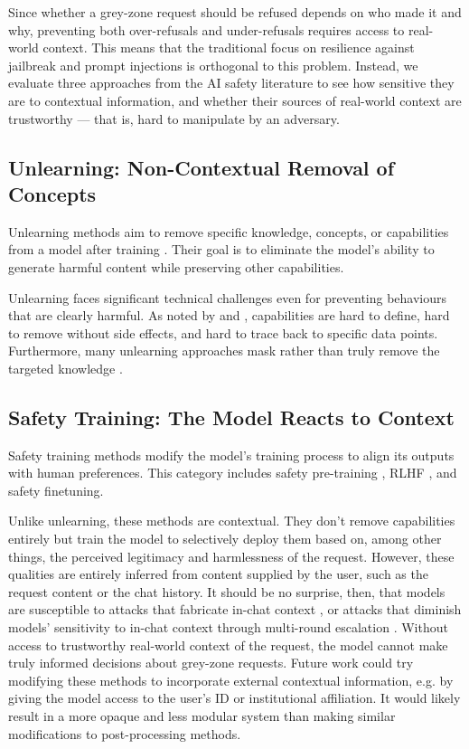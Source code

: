 \documentclass{article}
\theoremstyle{plain}
\theoremstyle{definition}
\theoremstyle{remark}
\begin{document}
Since whether a grey-zone request should be refused depends on who made it and why, preventing both over-refusals and under-refusals requires access to real-world context.
This means that the traditional focus on resilience against jailbreak and prompt injections is orthogonal to this problem.
Instead, we evaluate three approaches from the AI safety literature to see how sensitive they are to contextual information, and whether their sources of real-world context are trustworthy --- that is, hard to manipulate by an adversary.

\subsection{Unlearning: Non-Contextual Removal of Concepts}

Unlearning methods aim to remove specific knowledge, concepts, or
capabilities from a model after training
\cite{liu2024rethinkingmachineunlearninglarge}. Their goal is to
eliminate the model's ability to generate harmful content while
preserving other capabilities.

Unlearning faces significant technical challenges even for preventing behaviours that are clearly harmful.
As noted by \citet{cooper2024machineunlearningdoesntthink} and \citet{barez2025openproblemsmachineunlearning}, capabilities are hard to define, hard to remove without side effects, and hard to trace back to specific data points.
Furthermore, many unlearning approaches mask rather than truly remove the targeted knowledge \cite{deeb2025unlearningmethodsremoveinformation}.

\subsection{Safety Training: The Model Reacts to Context}

Safety training methods modify the model's training process to align
its outputs with human preferences.
This category includes safety pre-training \cite{maini2025safetypretraininggenerationsafe}, RLHF \cite{christiano2023deepreinforcementlearninghuman}, and safety finetuning.

Unlike unlearning, these methods are contextual.
They don't remove capabilities entirely but train the model to selectively deploy them based on, among other things, the perceived legitimacy and harmlessness of the request.
However, these qualities are entirely inferred from content supplied by the user, such as the request content or the chat history.
It should be no surprise, then, that models are susceptible to attacks that fabricate in-chat context \cite{zeng2024johnnypersuadellmsjailbreak}, or attacks that diminish models' sensitivity to in-chat context through multi-round escalation \cite{russinovich2025greatwritearticlethat}.
Without access to trustworthy real-world context of the request, the model cannot make truly informed decisions about grey-zone requests.
Future work could try modifying these methods to incorporate external contextual information, e.g. by giving the model access to the user's ID or institutional affiliation.
It would likely result in a more opaque and less modular system than making similar modifications to post-processing methods.
\end{document}
